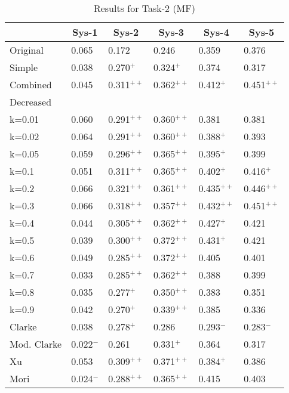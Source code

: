 \begin{table}[p]
  \begin{center}
    \caption{Results for Task-2 (MF)}
    \begin{tabular}{|l|l|l|l|l|l|} \hline
         &  \multicolumn{1}{c|}{Sys-1}        & \multicolumn{1}{c|}{Sys-2}        & \multicolumn{1}{c|}{Sys-3}        & \multicolumn{1}{c|}{Sys-4}        & \multicolumn{1}{c|}{Sys-5}        \\\hline
Original &  0.065        & 0.172        & 0.246        & 0.359        & 0.376        \\\hline      
Simple   &  0.038        & 0.270$^{+}$  & 0.324$^{+}$  & 0.374        & 0.317        \\\hline      
Combined &  0.045        & 0.311$^{++}$ & 0.362$^{++}$ & 0.412$^{+}$  & 0.451$^{++}$ \\\hline
Decreased&               &              &              &              &              \\
k=0.01   &  0.060        & 0.291$^{++}$ & 0.360$^{++}$ & 0.381        & 0.381        \\
k=0.02   &  0.064        & 0.291$^{++}$ & 0.360$^{++}$ & 0.388$^{+}$  & 0.393        \\      
k=0.05   &  0.059        & 0.296$^{++}$ & 0.365$^{++}$ & 0.395$^{+}$  & 0.399        \\      
k=0.1    &  0.051        & 0.311$^{++}$ & 0.365$^{++}$ & 0.402$^{+}$  & 0.416$^{+}$  \\      
k=0.2    &  0.066        & 0.321$^{++}$ & 0.361$^{++}$ & 0.435$^{++}$ & 0.446$^{++}$ \\      
k=0.3    &  0.066        & 0.318$^{++}$ & 0.357$^{++}$ & 0.432$^{++}$ & 0.451$^{++}$ \\      
k=0.4    &  0.044        & 0.305$^{++}$ & 0.362$^{++}$ & 0.427$^{+}$  & 0.421        \\      
k=0.5    &  0.039        & 0.300$^{++}$ & 0.372$^{++}$ & 0.431$^{+}$  & 0.421        \\      
k=0.6    &  0.049        & 0.285$^{++}$ & 0.372$^{++}$ & 0.405        & 0.401        \\      
k=0.7    &  0.033        & 0.285$^{++}$ & 0.362$^{++}$ & 0.388        & 0.399        \\      
k=0.8    &  0.035        & 0.277$^{+}$  & 0.350$^{++}$ & 0.383        & 0.351        \\      
k=0.9    &  0.042        & 0.270$^{+}$  & 0.339$^{++}$ & 0.385        & 0.336        \\\hline
Clarke   &  0.038        & 0.278$^{+}$  & 0.286        & 0.293$^{-}$  & 0.283$^{-}$\\\hline      
Mod. Clarke&0.022$^{-}$  & 0.261        & 0.331$^{+}$  & 0.364        & 0.317\\\hline      
Xu       &  0.053        & 0.309$^{++}$ & 0.371$^{++}$ & 0.384$^{+}$  & 0.386\\\hline      
Mori     &  0.024$^{-}$  & 0.288$^{++}$ & 0.365$^{++}$ & 0.415        & 0.403\\\hline      
\end{tabular}
\label{tab:task-2}
\end{center}
\end{table}

